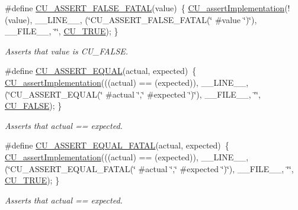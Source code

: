 \begin{DoxyCompactItemize}
\#define \hyperlink{group___framework_ga3929ac93488edb4fc9d59695173cf5ae}{C\+U\+\_\+\+A\+S\+S\+E\+R\+T\+\_\+\+F\+A\+L\+S\+E\+\_\+\+F\+A\+T\+A\+L}(value)~\{ \hyperlink{group___framework_gad409fc536d9d3fb5f659c76421e8ce3b}{C\+U\+\_\+assert\+Implementation}(!(value), \+\_\+\+\_\+\+L\+I\+N\+E\+\_\+\+\_\+, (\char`\"{}C\+U\+\_\+\+A\+S\+S\+E\+R\+T\+\_\+\+F\+A\+L\+S\+E\+\_\+\+F\+A\+T\+A\+L(\char`\"{} \#value \char`\"{})\char`\"{}), \+\_\+\+\_\+\+F\+I\+L\+E\+\_\+\+\_\+, \char`\"{}\char`\"{}, \hyperlink{group___framework_ga99641394bc766ca9c4a295e942fed1ef}{C\+U\+\_\+\+T\+R\+U\+E}); \}
\begin{DoxyCompactList}\small\item\em Asserts that value is C\+U\+\_\+\+F\+A\+L\+S\+E. \end{DoxyCompactList}\item 
\#define \hyperlink{group___framework_ga6f281701c682225d34636081cbd0fe9d}{C\+U\+\_\+\+A\+S\+S\+E\+R\+T\+\_\+\+E\+Q\+U\+A\+L}(actual, expected)~\{ \hyperlink{group___framework_gad409fc536d9d3fb5f659c76421e8ce3b}{C\+U\+\_\+assert\+Implementation}(((actual) == (expected)), \+\_\+\+\_\+\+L\+I\+N\+E\+\_\+\+\_\+, (\char`\"{}C\+U\+\_\+\+A\+S\+S\+E\+R\+T\+\_\+\+E\+Q\+U\+A\+L(\char`\"{} \#actual \char`\"{},\char`\"{} \#expected \char`\"{})\char`\"{}), \+\_\+\+\_\+\+F\+I\+L\+E\+\_\+\+\_\+, \char`\"{}\char`\"{}, \hyperlink{group___framework_ga7453214541b156ef868681eaafe60860}{C\+U\+\_\+\+F\+A\+L\+S\+E}); \}
\begin{DoxyCompactList}\small\item\em Asserts that actual == expected. \end{DoxyCompactList}\item 
\#define \hyperlink{group___framework_ga186009e7fdcfcde884e5d2d41ebac2ea}{C\+U\+\_\+\+A\+S\+S\+E\+R\+T\+\_\+\+E\+Q\+U\+A\+L\+\_\+\+F\+A\+T\+A\+L}(actual, expected)~\{ \hyperlink{group___framework_gad409fc536d9d3fb5f659c76421e8ce3b}{C\+U\+\_\+assert\+Implementation}(((actual) == (expected)), \+\_\+\+\_\+\+L\+I\+N\+E\+\_\+\+\_\+, (\char`\"{}C\+U\+\_\+\+A\+S\+S\+E\+R\+T\+\_\+\+E\+Q\+U\+A\+L\+\_\+\+F\+A\+T\+A\+L(\char`\"{} \#actual \char`\"{},\char`\"{} \#expected \char`\"{})\char`\"{}), \+\_\+\+\_\+\+F\+I\+L\+E\+\_\+\+\_\+, \char`\"{}\char`\"{}, \hyperlink{group___framework_ga99641394bc766ca9c4a295e942fed1ef}{C\+U\+\_\+\+T\+R\+U\+E}); \}
\begin{DoxyCompactList}\small\item\em Asserts that actual == expected. \end{DoxyCompactList}\item 

\end{DoxyCompactItemize}
